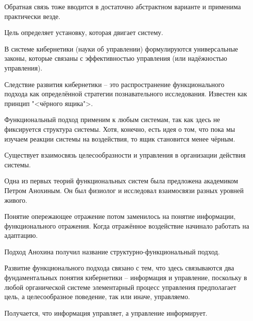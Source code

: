 \documentclass[main.tex]{subfiles}
\begin{document}
Обратная связь тоже вводится в достаточно абстрактном варианте и применима практически везде.

Цель определяет установку, которая двигает систему.



В системе кибернетики (науки об управлении) формулируются универсальные законы, которые связаны с эффективностью управления (или надёжностью управления).



Следствие развития кибернетики -- это распространение функционального подхода как определённой стратегии познавательного исследования.
Известен как принцип "<чёрного ящика">.

Функциональный подход применим к любым системам, так как здесь не фиксируется структура системы.
Хотя, конечно, есть идея о том, что пока мы изучаем реакции системы на воздействия, то ящик становится менее чёрным.

Существует взаимосвязь целесообразности и управления в организации действия системы.



Одна из первых теорий функциональных систем была предложена академиком Петром Анохиным.
Он был физиолог и исследовал взаимосвязи разных уровней живого.

Понятие опережающее отражение потом заменилось на понятие информации, функционального отражения.
Когда отражённое воздействие начинало работать на адаптацию.

Подход Анохина получил название структурно-функциональный подход.



Развитие функционального подхода связано с тем, что здесь связываются два фундаментальных понятия кибернетики -- информация и управление, поскольку в любой органической системе элементарный процесс управления предполагает цель, а целесообразное поведение, так или иначе, управляемо.

Получается, что информация управляет, а управление информирует.
\end{document}

